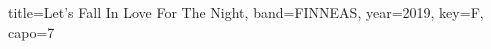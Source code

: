 \documentclass{../../tex/bekki-leadsheet}
\begin{document}
\begin{song}[transpose-capo=true]{title={Let's Fall In Love For The Night}, band={FINNEAS}, year={2019}, key={F}, capo={7}}

  

\end{song}
\end{document}
